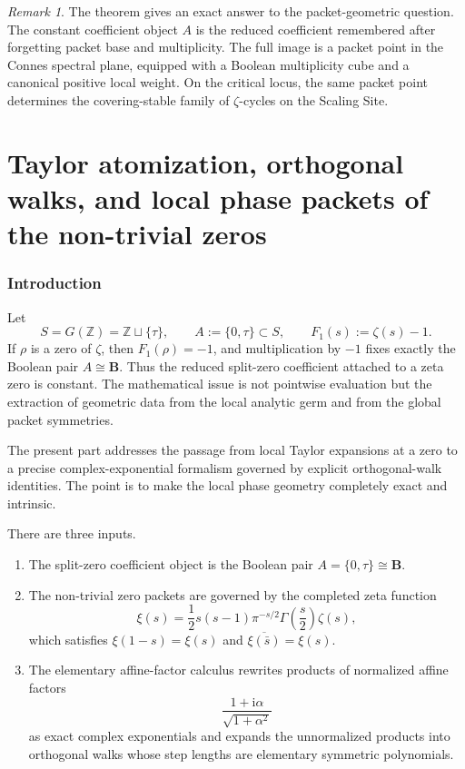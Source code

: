\documentclass[11pt,a4paper]{article}
\numberwithin{equation}{section}
\theoremstyle{definition}
\theoremstyle{remark}
\newtheorem{remark}[theorem]{Remark}
\newcommand{\ZZ}{\mathbb Z}
\newcommand{\BB}{\mathbf B}
\newcommand{\taup}{\tau}
\newcommand{\ii}{\mathrm i}
\newcommand{\setpartprefix}[1]{\def\partprefix{#1}\setcounter{section}{0}}
\def\partprefix{0}
\begin{document}
\begin{remark}
The theorem gives an exact answer to the packet-geometric question.  The constant coefficient object $A$ is the reduced coefficient remembered after forgetting packet base and multiplicity.  The full image is a packet point in the Connes spectral plane, equipped with a Boolean multiplicity cube and a canonical positive local weight.  On the critical locus, the same packet point determines the covering-stable family of $\zeta$-cycles on the Scaling Site.
\end{remark}

\part{Taylor atomization, orthogonal walks, and local phase packets of the non-trivial zeros}
\setpartprefix{IV}

\section{Introduction}

Let
\[
S=G(\ZZ)=\ZZ\sqcup\{\taup\},
\qquad
A:=\{0,\taup\}\subset S,
\qquad
F_1(s):=\zeta(s)-1.
\]
If $\rho$ is a zero of $\zeta$, then $F_1(\rho)=-1$, and multiplication by $-1$ fixes exactly the Boolean pair $A\cong\BB$.  Thus the reduced split-zero coefficient attached to a zeta zero is constant.  The mathematical issue is not pointwise evaluation but the extraction of geometric data from the local analytic germ and from the global packet symmetries.

The present part addresses the passage from local Taylor expansions at a zero to a precise complex-exponential formalism governed by explicit orthogonal-walk identities.  The point is to make the local phase geometry completely exact and intrinsic.

There are three inputs.
\begin{enumerate}[label=(\roman*)]
\item The split-zero coefficient object is the Boolean pair $A=\{0,\taup\}\cong\BB$.
\item The non-trivial zero packets are governed by the completed zeta function
\[
\xi(s)=\frac12 s(s-1)\pi^{-s/2}\Gamma\!\left(\frac s2\right)\zeta(s),
\]
which satisfies $\xi(1-s)=\xi(s)$ and $\overline{\xi(\bar s)}=\xi(s)$.
\item The elementary affine-factor calculus rewrites products of normalized affine factors
\[
\frac{1+\ii\alpha}{\sqrt{1+\alpha^2}}
\]
as exact complex exponentials and expands the unnormalized products into orthogonal walks whose step lengths are elementary symmetric polynomials.
\end{enumerate}
\end{document}
